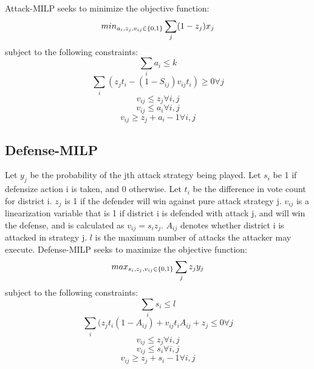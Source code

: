 \documentclass[letterpaper]{article} %
\begin{document}
Attack-MILP seeks to minimize the objective function:
\begin{equation}
min_{a_i,z_j,v_{ij} \in \{0,1\}}\sum_{j}(1-z_{j})x_j \\
\end{equation}
subject to the following constraints:
\begin{equation}
\sum_{i}a_{i} \leq k
\end{equation}
\begin{equation}
\sum_{i}(z_jt_i-(1-S_{ij})v_{ij}t_i) \geq 0 \forall j
\end{equation}
\begin{equation}
v_{ij} \leq z_j \forall i,j
\end{equation}
\begin{equation}
v_{ij} \leq a_i \forall i,j
\end{equation}
\begin{equation}
v_{ij} \geq z_j+a_i-1 \forall i,j
\end{equation}


\subsection{Defense-MILP}

Let $y_j$ be the probability of the jth attack strategy being played. Let $s_i$ be 1 if defensize action i is taken, and 0 otherwise. Let $t_i$ be the difference in vote count for district i. $z_j$ is 1 if the defender will win against pure attack strategy j. $v_{ij}$ is a linearization variable that is 1 if district i is defended with attack j, and will win the defense, and is calculated as $v_{ij} = s_iz_j$. $A_{ij}$ denotes whether district i is attacked in strategy j. $l$ is the maximum number of attacks the attacker may execute. 
Defense-MILP seeks to maximize the objective function:
\begin{equation}
max_{s_i,z_j,v_{ij} \in \{0,1\}}\sum_{j}z_{j}y_j \\
\end{equation}
subject to the following constraints:
\begin{equation}
\sum_{i}s_{i} \leq l
\end{equation}
\begin{equation}
\sum_{i}(z_jt_i(1-A_{ij}) + v_{ij}t_iA_{ij} + z_j \leq 0 \forall j
\end{equation}
\begin{equation}
v_{ij} \leq z_j \forall i,j
\end{equation}
\begin{equation}
v_{ij} \leq s_i \forall i,j
\end{equation}
\begin{equation}
v_{ij} \geq z_j+s_i-1 \forall i,j
\end{equation}
\end{document}
